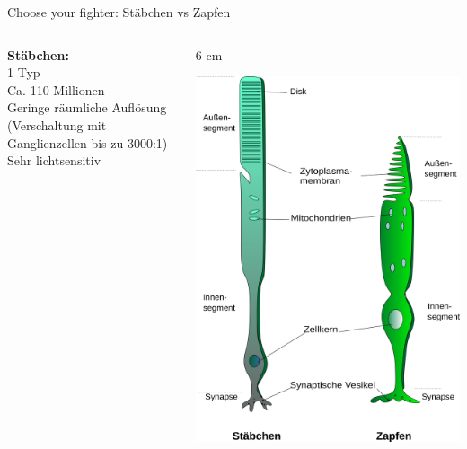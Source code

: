 \documentclass{beamer}
\begin{document}
    
    
    \begin{frame}{Choose your fighter: Stäbchen vs Zapfen}


\begin{columns}[c]

\begin{column}{2.5cm}
\textbf{Stäbchen:} \\[0.5 cm]

1 Typ \\

Ca. 110 Millionen  \\

Geringe räumliche Auflösung (Verschaltung mit Ganglienzellen bis zu 3000:1) \\

Sehr lichtsensitiv \\
\end{column}


\begin{column} {6 cm}
    \begin{center}
        \includegraphics[width=1\textwidth]{Cone_rode.png}
    \end{center}


\end{column}
\end{columns}
\end{frame}
\end{document}
